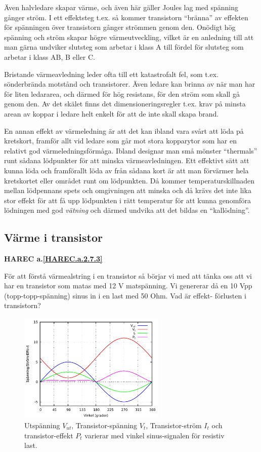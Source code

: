 Även halvledare skapar värme, och även här gäller Joules lag med spänning
gånger ström. I ett effektsteg t.ex. så kommer transistorn ``bränna'' av
effekten för spänningen över transistorn gånger strömmen genom den. Onödigt
hög spänning och ström skapar högre värmeutveckling, vilket är en anledning
till att man gärna undviker slutsteg som arbetar i klass A till fördel för
slutsteg som arbetar i klass AB, B eller C.

Bristande värmeavledning leder ofta till ett katastrofalt fel, som t.ex.
sönderbrända motstånd och transistorer. Även ledare kan brinna av när man
har för liten ledararea, och därmed för hög resistans, för den ström som
skall gå genom den. Av det skälet finns det dimensioneringsregler t.ex.
krav på minsta arean av koppar i ledare helt enkelt för att de inte skall
skapa brand.

En annan effekt av värmeledning är att det kan ibland vara svårt att löda
på kretskort, framför allt  vid ledare som går mot stora kopparytor som
har en relativt god värmeledningsförmåga. Ibland designar man små mönster
``thermals'' runt sådana lödpunkter för att minska värmeavledningen.
Ett effektivt sätt att kunna löda och framförallt löda av från sådana
kort är att man förvärmer hela kretskortet eller området runt om
lödpunkten. Då kommer temperaturskillnaden mellan lödpennans spets och
omgivningen att minska och då krävs det inte lika stor effekt för att få
upp lödpunkten i rätt temperatur för att kunna genomföra lödningen med god
\emph{vätning} och därmed undvika att det bildas en ``kallödning''.

\subsection{Värme i transistor}
\textbf{
HAREC a.\ref{HAREC.a.2.7.3}\label{myHAREC.a.2.7.3}
}

För att förstå värmealstring i en transistor så börjar vi med att tänka oss
att vi har en transistor som matas med 12 V matspänning. Vi genererar då en
10 Vpp (topp-topp-spänning) sinus in i en last med 50 Ohm. Vad är effekt-
förlusten i transistorn?

\begin{figure}[h]
\begin{center}
\includegraphics[width=7cm]{images/power1}
\caption{Utspänning $V_{ut}$, Transistor-spänning $V_t$, Transistor-ström $I_t$ och transistor-effekt $P_t$ varierar med vinkel sinus-signalen för resistiv last.}
\label{fig:power1}
\end{center}
\end{figure}

